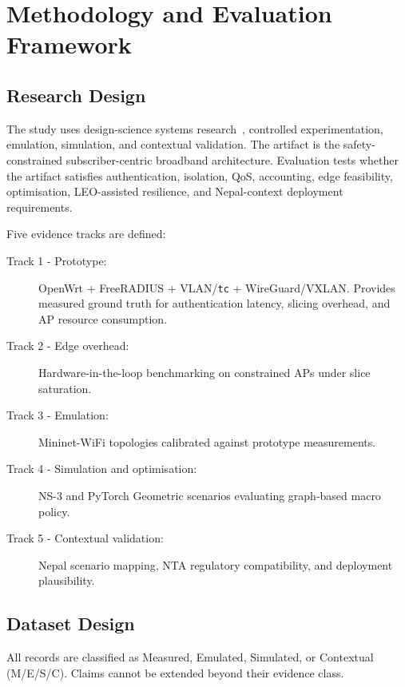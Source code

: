 \chapter{Methodology and Evaluation Framework}
\label{ch:methodology}

\section{Research Design}
\label{sec:design}

The study uses design-science systems research~\cite{hevner2004design}, controlled experimentation, emulation, simulation, and contextual validation. The artifact is the safety-constrained subscriber-centric broadband architecture. Evaluation tests whether the artifact satisfies authentication, isolation, QoS, accounting, edge feasibility, optimisation, LEO-assisted resilience, and Nepal-context deployment requirements.

Five evidence tracks are defined:
\begin{description}
  \item[Track 1 - Prototype:] OpenWrt + FreeRADIUS + VLAN/\texttt{tc} + WireGuard/VXLAN. Provides measured ground truth for authentication latency, slicing overhead, and AP resource consumption.
  \item[Track 2 - Edge overhead:] Hardware-in-the-loop benchmarking on constrained APs under slice saturation.
  \item[Track 3 - Emulation:] Mininet-WiFi topologies calibrated against prototype measurements.
  \item[Track 4 - Simulation and optimisation:] NS-3 and PyTorch Geometric scenarios evaluating graph-based macro policy.
  \item[Track 5 - Contextual validation:] Nepal scenario mapping, NTA regulatory compatibility, and deployment plausibility.
\end{description}

\section{Dataset Design}
\label{sec:dataset}

All records are classified as Measured, Emulated, Simulated, or Contextual (M/E/S/C). Claims cannot be extended beyond their evidence class.

